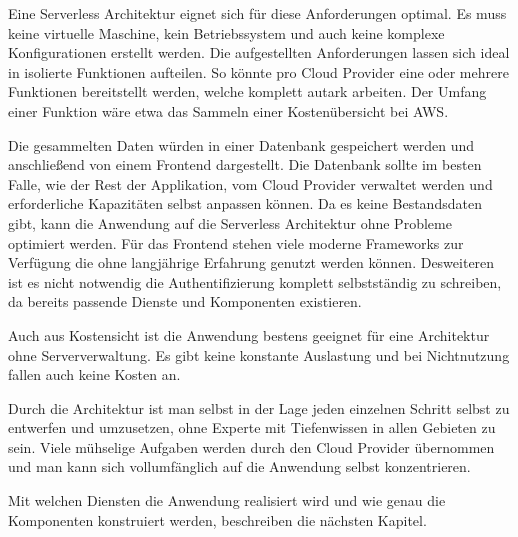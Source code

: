 Eine Serverless Architektur eignet sich für diese Anforderungen optimal.
Es muss keine virtuelle Maschine, kein Betriebssystem und auch keine komplexe Konfigurationen erstellt werden.
Die aufgestellten Anforderungen lassen sich ideal in isolierte Funktionen aufteilen.
So könnte pro Cloud Provider eine oder mehrere Funktionen bereitstellt werden, welche komplett autark arbeiten.
Der Umfang einer Funktion wäre etwa das Sammeln einer Kostenübersicht bei AWS.

Die gesammelten Daten würden in einer Datenbank gespeichert werden und anschließend von einem Frontend dargestellt.
Die Datenbank sollte im besten Falle, wie der Rest der Applikation, vom Cloud Provider verwaltet werden und erforderliche Kapazitäten selbst anpassen können.
Da es keine Bestandsdaten gibt, kann die Anwendung auf die Serverless Architektur ohne Probleme optimiert werden.
Für das Frontend stehen viele moderne Frameworks zur Verfügung die ohne langjährige Erfahrung genutzt werden können.
Desweiteren ist es nicht notwendig die Authentifizierung komplett selbstständig zu schreiben, da bereits passende Dienste und Komponenten existieren.

Auch aus Kostensicht ist die Anwendung bestens geeignet für eine Architektur ohne Serververwaltung.
Es gibt keine konstante Auslastung und bei Nichtnutzung fallen auch keine Kosten an.


Durch die Architektur ist man selbst in der Lage jeden einzelnen Schritt selbst zu entwerfen und umzusetzen, ohne Experte mit Tiefenwissen in allen Gebieten zu sein.
Viele mühselige Aufgaben werden durch den Cloud Provider übernommen und man kann sich vollumfänglich auf die Anwendung selbst konzentrieren.

Mit welchen Diensten die Anwendung realisiert wird und wie genau die Komponenten konstruiert werden, beschreiben die nächsten Kapitel.



